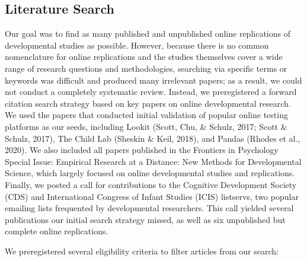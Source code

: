 \documentclass[
  man,floatsintext]{apa6}
\begin{document}
\hypertarget{literature-search}{%
\subsection{Literature Search}\label{literature-search}}

Our goal was to find as many published and unpublished online replications of developmental studies as possible. However, because there is no common nomenclature for online replications and the studies themselves cover a wide range of research questions and methodologies, searching via specific terms or keywords was difficult and produced many irrelevant papers; as a result, we could not conduct a completely systematic review. Instead, we preregistered a forward citation search strategy based on key papers on online developmental research. We used the papers that conducted initial validation of popular online testing platforms as our seeds, including Lookit (Scott, Chu, \& Schulz, 2017; Scott \& Schulz, 2017), The Child Lab (Sheskin \& Keil, 2018), and Pandas (Rhodes et al., 2020). We also included all papers published in the Frontiers in Psychology Special Issue: Empirical Research at a Distance: New Methods for Developmental Science, which largely focused on online developmental studies and replications. Finally, we posted a call for contributions to the Cognitive Development Society (CDS) and International Congress of Infant Studies (ICIS) listservs, two popular emailing lists frequented by developmental researchers. This call yielded several publications our initial search strategy missed, as well as six unpublished but complete online replications.

We preregistered several eligibility criteria to filter articles from our search:
\end{document}
